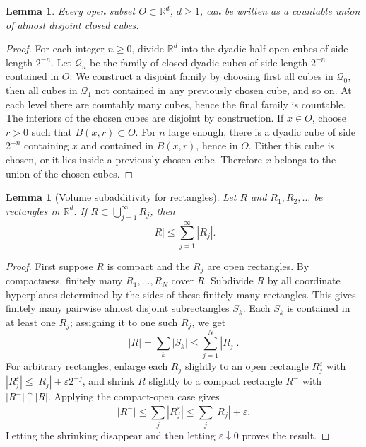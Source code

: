 \documentclass[11pt,openany]{book}
\numberwithin{equation}{chapter}
\theoremstyle{definition}
\theoremstyle{plain}
\newtheorem{lemma}[definition]{Lemma}
\theoremstyle{remark}
\newcommand{\R}{\mathbb{R}}
\newcommand{\eps}{\varepsilon}
\newcommand{\1}{\mathbf{1}}
\newcommand{\abs}[1]{\left\lvert #1\right\rvert}
\begin{document}
\begin{lemma}
Every open subset \(O\subset\R^d\), \(d\ge1\), can be written as a countable union of almost disjoint closed cubes.
\end{lemma}

\begin{proof}
For each integer \(n\ge0\), divide \(\R^d\) into the dyadic half-open cubes of side length \(2^{-n}\).  Let \(\mathcal{Q}_n\) be the family of closed dyadic cubes of side length \(2^{-n}\) contained in \(O\).  We construct a disjoint family by choosing first all cubes in \(\mathcal{Q}_0\), then all cubes in \(\mathcal{Q}_1\) not contained in any previously chosen cube, and so on.  At each level there are countably many cubes, hence the final family is countable.  The interiors of the chosen cubes are disjoint by construction.  If \(x\in O\), choose \(r>0\) such that \(B(x,r)\subset O\).  For \(n\) large enough, there is a dyadic cube of side \(2^{-n}\) containing \(x\) and contained in \(B(x,r)\), hence in \(O\).  Either this cube is chosen, or it lies inside a previously chosen cube.  Therefore \(x\) belongs to the union of the chosen cubes.
\end{proof}

\begin{lemma}[Volume subadditivity for rectangles]
Let \(R\) and \(R_1,R_2,\ldots\) be rectangles in \(\R^d\).  If \(R\subset\bigcup_{j=1}^\infty R_j\), then
\[
    \abs{R}\le \sum_{j=1}^\infty \abs{R_j}.
\]
\end{lemma}

\begin{proof}
First suppose \(R\) is compact and the \(R_j\) are open rectangles.  By compactness, finitely many \(R_1,\ldots,R_N\) cover \(R\).  Subdivide \(R\) by all coordinate hyperplanes determined by the sides of these finitely many rectangles.  This gives finitely many pairwise almost disjoint subrectangles \(S_k\).  Each \(S_k\) is contained in at least one \(R_j\); assigning it to one such \(R_j\), we get
\[
    \abs{R}=\sum_k \abs{S_k}\le \sum_{j=1}^N \abs{R_j}.
\]
For arbitrary rectangles, enlarge each \(R_j\) slightly to an open rectangle \(R_j^\eps\) with \(\abs{R_j^\eps}\le \abs{R_j}+\eps 2^{-j}\), and shrink \(R\) slightly to a compact rectangle \(R^-\) with \(\abs{R^-}\uparrow \abs{R}\).  Applying the compact-open case gives
\[
    \abs{R^-}\le\sum_j \abs{R_j^\eps}\le \sum_j\abs{R_j}+\eps.
\]
Letting the shrinking disappear and then letting \(\eps\downarrow0\) proves the result.
\end{proof}
\end{document}
